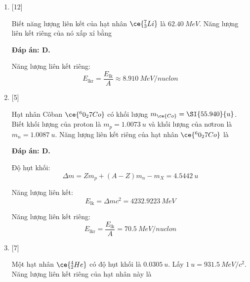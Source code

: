 \begin{enumerate}[label=\bfseries Câu \arabic*:]
{	}
	
	\item {} [12]
	\cauhoi
	{Biết năng lượng liên kết của hạt nhân $\ce{^7_3 Li}$ là $\SI{62.40}{MeV}$. Năng lượng liên kết riêng của nó xấp xỉ bằng
	}
	
	\loigiai
	{		\textbf{Đáp án: D.}
		
		Năng lượng liên kết riêng:
		$$E_\text{lkr} = \dfrac{E_\text{lk}}{A} \approx \SI{8.910}{MeV/nuclon} $$
		
	}
	
	
	
	\item {} [5]
	\cauhoi
	{Hạt nhân Côban $\ce{^60_27 Co}$ có khối lượng $m_{\ce{Co}} = \SI{55.940}{u}$. Biết khối lượng của proton là $m_p=\SI{1.0073}{u}$ và khối lượng của nơtron là $m_n=\SI{1.0087}{u}$. Năng lượng liên kết riêng của hạt nhân $\ce{^60_27 Co}$ là
	}
	
	\loigiai
	{		\textbf{Đáp án: D.}
		
		Độ hụt khối:
		$$\Delta m = Zm_p + (A-Z)m_n - m_X = \SI{4.5442}{u}$$
		
		Năng lượng liên kết:
		$$E_\text{lk} = \Delta m c^2 = \SI{4232.9223}{MeV}$$
		
		Năng lượng liên kết riêng:
		$$E_\text{lkr} = \dfrac{E_\text{lk}}{A} =\SI{70.5}{MeV/nuclon} $$
		
	}
	
	\item {} [7]
	\cauhoi
	{Một hạt nhân $\ce{^4_2 He}$ có độ hụt khối là $\SI{0.0305}{u}$. Lấy $\SI{1}{u} = \SI{931.5}{MeV/c^2}$. Năng lượng liên kết riêng của hạt nhân này là
	}
	

\end{enumerate}

